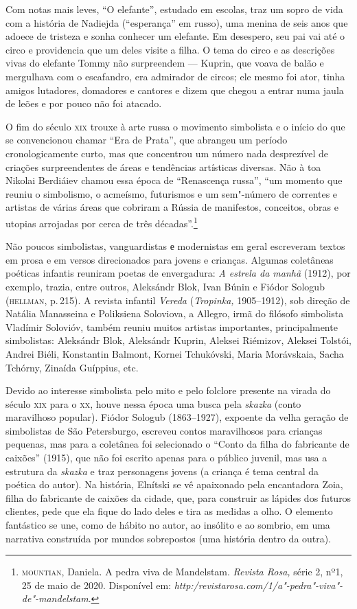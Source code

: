 Com notas mais leves, ``O elefante'', estudado em escolas, traz um sopro
de vida com a história de Nadiejda (``esperança'' em russo), uma menina
de seis anos que adoece de tristeza e sonha conhecer um elefante. Em
desespero, seu pai vai até o circo e providencia que um deles visite a
filha. O tema do circo e as descrições vivas do elefante Tommy não
surpreendem --- Kuprin, que voava de balão e mergulhava com o
escafandro, era admirador de circos; ele mesmo foi ator, tinha amigos
lutadores, domadores e cantores e dizem que chegou a entrar numa jaula
de leões e por pouco não foi atacado.

O fim do século \textsc{xix} trouxe à arte russa o movimento simbolista e o
início do que se convencionou chamar ``Era de Prata'', que abrangeu um
período cronologicamente curto, mas que concentrou um número nada
desprezível de criações surpreendentes de áreas e tendências artísticas
diversas. Não à toa Nikolai Berdiáiev chamou essa época de ``Renascença
russa'', ``um momento que reuniu o simbolismo, o acmeísmo, futurismos e
um sem"-número de correntes e artistas de várias áreas que cobriram a
Rússia de manifestos, conceitos, obras e utopias arrojadas por cerca de
três décadas''.\footnote{\textsc{mountian}, Daniela. A pedra viva de Mandelstam.
  \emph{Revista Rosa,} série 2, nº1, 25 de maio de 2020. Disponível em:
  \emph{http:/revistarosa.com/1/a"-pedra"-viva"-de"-mandelstam}.}

Não poucos simbolistas, vanguardistas е modernistas em geral escreveram
textos em prosa e em versos direcionados para jovens e crianças. Algumas
coletâneas poéticas infantis reuniram poetas de envergadura: \emph{A
estrela da manhã} (1912), por exemplo, trazia, entre outros,
Aleksándr Blok, Ivan Búnin e Fiódor Sologub (\textsc{hellman}, p.\,215). A revista
infantil \emph{Vereda} (\emph{Tropinka,} 1905--1912), sob direção de
Natália Manasseina e Poliksiena Soloviova, a Allegro, irmã do filósofo simbolista Vladímir Solovióv,
também reuniu muitos artistas importantes, principalmente simbolistas:
Aleksándr Blok, Aleksándr Kuprin, Aleksei Riémizov, Aleksei Tolstói,
Andrei Biéli, Konstantin Balmont, Kornei Tchukóvski, Maria Morávskaia,
Sacha Tchórny, Zinaída Guíppius, etc.

Devido ao interesse simbolista pelo mito e pelo folclore presente na
virada do século \textsc{xix} para o \textsc{xx}, houve nessa época uma busca pela
\emph{skazka} (conto maravilhoso popular). Fiódor Sologub (1863--1927),
expoente da velha geração de simbolistas de São Petersburgo, escreveu
contos maravilhosos para crianças pequenas, mas para a coletânea foi
selecionado o ``Conto da filha do fabricante de caixões'' (1915),
que não foi escrito apenas para o público juvenil, mas usa a estrutura
da \emph{skazka} e traz personagens jovens (a criança é tema central da
poética do autor). Na história, Elnítski se vê apaixonado pela
encantadora Zoia, filha do fabricante de caixões da cidade, que, para
construir as lápides dos futuros clientes, pede que ela fique do lado
deles e tira as medidas a olho. O elemento fantástico se une, como de
hábito no autor, ao insólito e ao sombrio, em uma narrativa construída
por mundos sobrepostos (uma história dentro da outra).

